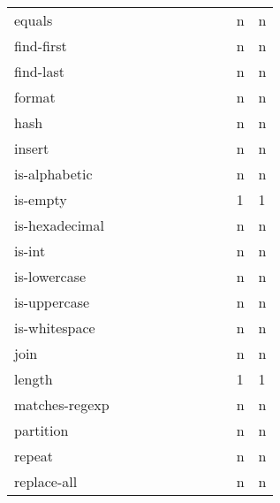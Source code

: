 \documentclass[anonymous,sigplan,review,11pt,nonacm,natbib=false]{acmart}
\begin{document}
\begin{table*}
\begin{tabular}{lllllllllll}
            equals &  &  &  &  &  & &  &  & n & n \\

            find-first &  &  &  &  &  & &  &  & n & n \\

            find-last &  &  &  &  &  & &  &  & n & n \\

            format &  &  &  &  &  & &  &  & n & n \\

            hash &  &  &  &  &  & &  &  & n & n \\

            insert &  &  &  &  &  & &  &  & n & n \\

            is-alphabetic &  &  &  &  &  & &  &  & n & n \\

            is-empty &  &  &  &  &  & &  &  & 1 & 1 \\

            is-hexadecimal &  &  &  &  &  & &  &  & n & n \\

            is-int &  &  &  &  &  & &  &  & n & n \\

            is-lowercase &  &  &  &  &  & &  &  & n & n \\

            is-uppercase &  &  &  &  &  & &  &  & n & n \\

            is-whitespace &  &  &  &  &  & &  &  & n & n \\

            join &  &  &  &  &  & &  &  & n & n \\

            length &  &  &  &  &  & &  &  & 1 & 1 \\

            matches-regexp &  &  &  &  &  & &  &  & n & n \\

            partition &  &  &  &  &  & &  &  & n & n \\

            repeat &  &  &  &  &  & &  &  & n & n \\

            replace-all &  &  &  &  &  & &  &  & n & n \\


\end{tabular}
\end{table*}
\end{document}
